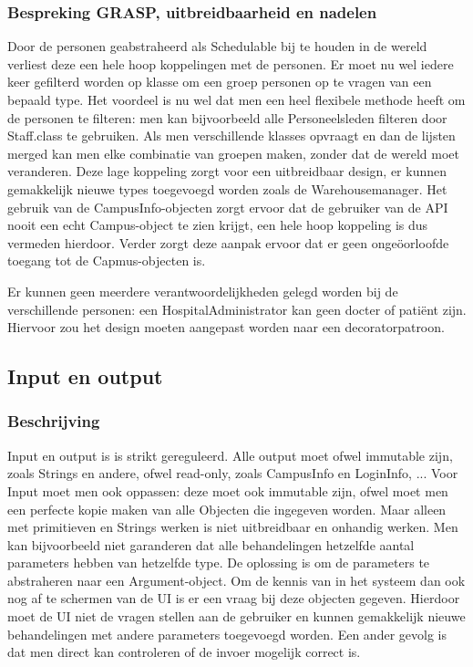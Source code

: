 \documentclass[a4paper]{article}
\begin{document}
\subsubsection{Bespreking GRASP, uitbreidbaarheid en nadelen}
Door de personen geabstraheerd als Schedulable bij te houden in de wereld verliest deze een hele hoop koppelingen met de personen. Er moet nu wel iedere keer gefilterd worden op klasse om een groep personen op te vragen van een bepaald type. Het voordeel is nu wel dat men een heel flexibele methode heeft om de personen te filteren: men kan bijvoorbeeld alle Personeelsleden filteren door Staff.class te gebruiken. Als men verschillende klasses opvraagt en dan de lijsten merged kan men elke combinatie van groepen maken, zonder dat de wereld moet veranderen. Deze lage koppeling zorgt voor een uitbreidbaar design, er kunnen gemakkelijk nieuwe types toegevoegd worden zoals de Warehousemanager.
Het gebruik van de CampusInfo-objecten zorgt ervoor dat de gebruiker van de API nooit een echt Campus-object te zien krijgt, een hele hoop koppeling is dus vermeden hierdoor. Verder zorgt deze aanpak ervoor dat er geen onge\"oorloofde toegang tot de Capmus-objecten is.

Er kunnen geen meerdere verantwoordelijkheden gelegd worden bij de verschillende personen: een HospitalAdministrator kan geen docter of pati\"ent zijn. Hiervoor zou het design moeten aangepast worden naar een decoratorpatroon.


\subsection{Input en output}
\subsubsection{Beschrijving}
Input en output is is strikt gereguleerd. Alle output moet ofwel immutable zijn, zoals Strings en andere, ofwel read-only, zoals CampusInfo en LoginInfo, ... 
Voor Input moet men ook oppassen: deze moet ook immutable zijn, ofwel moet men een perfecte kopie maken van alle Objecten die ingegeven worden. Maar alleen met primitieven en Strings werken is niet uitbreidbaar en onhandig werken.
Men kan bijvoorbeeld niet garanderen dat alle behandelingen hetzelfde aantal parameters hebben van hetzelfde type. 
De oplossing is om de parameters te abstraheren naar een Argument-object. 
Om de kennis van in het systeem dan ook nog af te schermen van de UI is er een vraag bij deze objecten gegeven. Hierdoor moet de UI niet de vragen stellen aan de gebruiker en kunnen gemakkelijk nieuwe behandelingen met andere parameters toegevoegd worden. Een ander gevolg is dat men direct kan controleren of de invoer mogelijk correct is.
\end{document}
